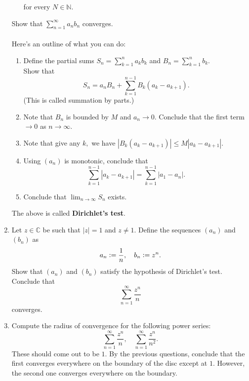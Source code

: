 \documentclass[12pt]{article}
\theoremstyle{definition}
\numberwithin{thm}{section}
\begin{document}
\begin{enumerate}
\begin{enumerate}
		for every $N \in \mathbb{N}.$
	\end{enumerate}
	Show that $\displaystyle\sum_{n=1}^{\infty}a_nb_n$ converges.\\~\\
	Here's an outline of what you can do:
	\begin{enumerate}
		\item Define the partial sums $S_n = \displaystyle\sum_{k=1}^{n}a_kb_k$ and $B_n = \displaystyle\sum_{k=1}^{n}b_k.$\\
		Show that
		\begin{equation*} 
			S_n = a_nB_n + \sum_{k=1}^{n-1}B_k(a_k - a_{k+1}).
		\end{equation*}
		(This is called summation by parts.)
		\item Note that $B_n$ is bounded by $M$ and $a_n \to 0.$ Conclude that the first term $\to 0$ as $n \to \infty.$
		\item Note that give any $k,$ we have $|B_k(a_k - a_{k+1})| \le M|a_k - a_{k+1}|.$
		\item Using $(a_n)$ is monotonic, conclude that
		\begin{equation*} 
			\sum_{k=1}^{n-1}|a_k - a_{k+1}| = \sum_{k=1}^{n-1}|a_1 - a_n|.
		\end{equation*}
		\item Conclude that $\displaystyle\lim_{n\to \infty}S_n$ exists.
	\end{enumerate}
	The above is called \textbf{Dirichlet's test}.
	\item Let $z \in \mathbb{C}$ be such that $|z| = 1$ and $z \neq 1.$ Define the sequences $(a_n)$ and $(b_n)$ as
	\begin{equation*} 
		a_n \vcentcolon= \dfrac{1}{n}, \quad b_n \vcentcolon= z^n.
	\end{equation*}
	Show that $(a_n)$ and $(b_n)$ satisfy the hypothesis of Dirichlet's test. Conclude that
	\begin{equation*} 
		\sum_{n=1}^{\infty}\dfrac{z^n}{n}
	\end{equation*}
	converges.
	\item Compute the radius of convergence for the following power series:
	\begin{equation*} 
		\sum_{n=1}^{\infty}\dfrac{z^n}{n}, \quad \sum_{n=1}^{\infty}\dfrac{z^n}{n^2}.
	\end{equation*}
	These should come out to be $1.$ By the previous questions, conclude that the first converges everywhere on the boundary of the disc except at $1.$ However, the second one converges everywhere on the boundary.\\

\end{enumerate}
\end{document}
